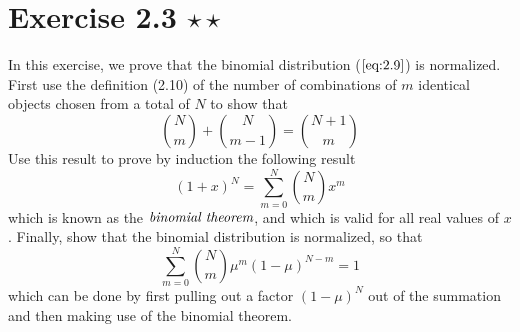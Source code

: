 \section*{Exercise 2.3 $\star \star$}
In this exercise, we prove that the binomial distribution ($\ref{eq:2.9}$)
is normalized. First use the definition (2.10) of the number of combinations of
$m$ identical objects chosen from a total of $N$ to show that
\begin{equation*}
    \binom{N}{m} + \binom{N}{m-1} = \binom{N+1}{m}
    \tag{2.262}\label{eq:2.262}
\end{equation*}
Use this result to prove by induction the following result
\begin{equation*}
    (1 + x)^N = \sum_{m=0}^{N} \binom{N}{m}x^m
    \tag{2.263}\label{eq:2.263}
\end{equation*}
which is known as the $\emph{binomial theorem}$, and which is valid 
for all real values of $x$. 
Finally, show that the binomial distribution is normalized, so that
\begin{equation*}
    \sum_{m=0}^{N} \binom{N}{m} \mu^m(1 - \mu)^{N - m} = 1 
    \tag{2.264}\label{eq:2.264}
\end{equation*}
which can be done by first pulling out a factor $(1 - \mu)^N$ out of the summation
and then making use of the binomial theorem.

